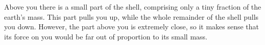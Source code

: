 Above you there is a small part of the shell, comprising only a tiny fraction
of the earth's mass. This part pulls you up, while the whole remainder of the shell pulls you down. However, the part
above you is extremely close, so it makes sense that its force on you would be far out of proportion to its small mass.



